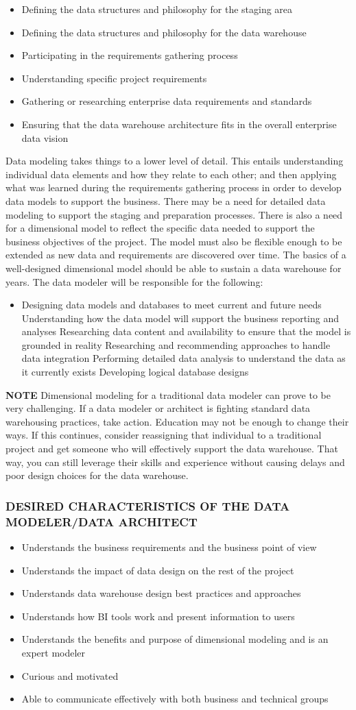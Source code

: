 \documentclass{vldb}
\newcommand{\bi}{\begin{itemize}}
\newcommand{\ei}{\end{itemize}}
\newcommand{\ii}{\item}
\begin{document}
\bi
\ii Defining the data structures and philosophy for the staging area 
\ii Defining the data structures and philosophy for the data warehouse 
\ii Participating in the requirements gathering process
\ii Understanding specific project requirements
\ii Gathering or researching enterprise data requirements and standards
\ii Ensuring that the data warehouse architecture fits in the overall enterprise data vision
\ei

Data modeling takes things to a lower level of detail. This entails understanding individual data elements and how they relate to each other; and then applying what was learned during the requirements gathering process in order to develop data models to support the business. There may be a need for detailed data modeling to support the staging and preparation processes. There is also a need for a dimensional model to reflect the specific data needed to support the business objectives of the project. The model must also be flexible enough to be extended as new data and requirements are discovered over time. The basics of a well-designed dimensional model should be able to sustain a data warehouse for years. The data modeler will be responsible for the following:

\bi
\ii Designing data models and databases to meet current and future needs
Understanding how the data model will support the business reporting and analyses
Researching data content and availability to ensure that the model is grounded in reality
Researching and recommending approaches to handle data integration
Performing detailed data analysis to understand the data as it currently exists
Developing logical database designs
\ei

\noindent
\textbf{NOTE} Dimensional modeling for a traditional data modeler can prove to be very challenging. If a data modeler or architect is fighting standard data warehousing practices, take action. Education may not be enough to change their ways. If this continues, consider reassigning that individual to a traditional project and get someone who will effectively support the data warehouse. That way, you can still leverage their skills and experience without causing delays and poor design choices for the data warehouse.

\subsubsection*{DESIRED CHARACTERISTICS OF THE DATA MODELER/DATA ARCHITECT}
\bi
\ii Understands the business requirements and the business point of view
\ii Understands the impact of data design on the rest of the project
\ii Understands data warehouse design best practices and approaches
\ii Understands how BI tools work and present information to users
\ii Understands the benefits and purpose of dimensional modeling and is an expert modeler
\ii Curious and motivated
\ii Able to communicate effectively with both business and technical groups
\ei
\end{document}
